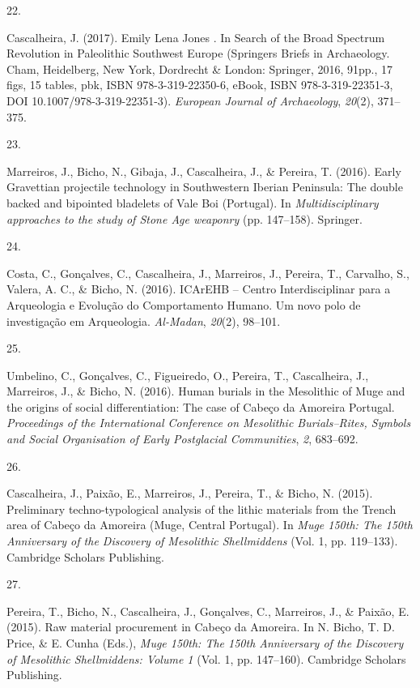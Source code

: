 \documentclass[11pt,a4paper,]{awesome-cv}
\newlength{\cslhangindent}
\newlength{\csllabelwidth}
\newenvironment{CSLReferences}[2] %
 {\begin{list}{}{%
  \setlength{\itemindent}{0pt}
  \setlength{\leftmargin}{0pt}
  \setlength{\parsep}{0pt}
  \ifodd #1
   \setlength{\leftmargin}{\cslhangindent}
   \setlength{\itemindent}{-1\cslhangindent}
  \fi
  \setlength{\itemsep}{#2\baselineskip}}}
 {\end{list}}
\newcommand{\CSLLeftMargin}[1]{\parbox[t]{\csllabelwidth}{\strut#1\strut}}
\newcommand{\CSLRightInline}[1]{\parbox[t]{\linewidth - \csllabelwidth}{\strut#1\strut}}
\begin{document}
\begin{CSLReferences}{0}{0}
\CSLLeftMargin{22. }%
\CSLRightInline{Cascalheira, J. (2017). Emily Lena Jones . In Search of
the Broad Spectrum Revolution in Paleolithic Southwest Europe (Springers
Briefs in Archaeology. Cham, Heidelberg, New York, Dordrecht \& London:
Springer, 2016, 91pp., 17 figs, 15 tables, pbk, ISBN 978-3-319-22350-6,
eBook, ISBN 978-3-319-22351-3, DOI 10.1007/978-3-319-22351-3).
\emph{European Journal of Archaeology}, \emph{20}(2), 371--375.}

\CSLLeftMargin{23. }%
\CSLRightInline{Marreiros, J., Bicho, N., Gibaja, J., Cascalheira, J.,
\& Pereira, T. (2016). Early Gravettian projectile technology in
Southwestern Iberian Peninsula: The double backed and bipointed
bladelets of Vale Boi (Portugal). In \emph{Multidisciplinary approaches
to the study of Stone Age weaponry} (pp. 147--158). Springer.}

\CSLLeftMargin{24. }%
\CSLRightInline{Costa, C., Gonçalves, C., Cascalheira, J., Marreiros,
J., Pereira, T., Carvalho, S., Valera, A. C., \& Bicho, N. (2016).
ICArEHB -- Centro Interdisciplinar para a Arqueologia e Evolução do
Comportamento Humano. Um novo polo de investigação em Arqueologia.
\emph{Al-Madan}, \emph{20}(2), 98--101.}

\CSLLeftMargin{25. }%
\CSLRightInline{Umbelino, C., Gonçalves, C., Figueiredo, O., Pereira,
T., Cascalheira, J., Marreiros, J., \& Bicho, N. (2016). Human burials
in the Mesolithic of Muge and the origins of social differentiation: The
case of Cabeço da Amoreira Portugal. \emph{Proceedings of the
International Conference on Mesolithic Burials--Rites, Symbols and
Social Organisation of Early Postglacial Communities}, \emph{2},
683--692.}

\CSLLeftMargin{26. }%
\CSLRightInline{Cascalheira, J., Paixão, E., Marreiros, J., Pereira, T.,
\& Bicho, N. (2015). Preliminary techno-typological analysis of the
lithic materials from the Trench area of Cabeço da Amoreira (Muge,
Central Portugal). In \emph{Muge 150th: The 150th Anniversary of the
Discovery of Mesolithic Shellmiddens} (Vol. 1, pp. 119--133). Cambridge
Scholars Publishing.}

\CSLLeftMargin{27. }%
\CSLRightInline{Pereira, T., Bicho, N., Cascalheira, J., Gonçalves, C.,
Marreiros, J., \& Paixão, E. (2015). Raw material procurement in Cabeço
da Amoreira. In N. Bicho, T. D. Price, \& E. Cunha (Eds.), \emph{Muge
150th: The 150th Anniversary of the Discovery of Mesolithic
Shellmiddens: Volume 1} (Vol. 1, pp. 147--160). Cambridge Scholars
Publishing.}


\end{CSLReferences}
\end{document}
